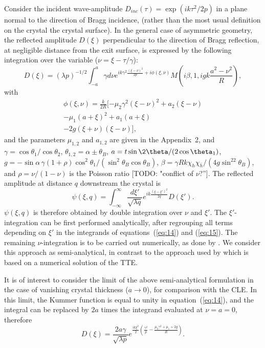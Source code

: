 \documentclass[preprint]{iucr}              %
\newcommand{\todo}[1]{{\color{red}[TODO: "#1'']}}
\newcommand{\inblue}[1]{{\color{blue}#1}}
\begin{document}
Consider the incident  wave-amplitude $D_{inc}(\tau)=\exp(i k \tau^2/ 2 p)$ in a plane normal to the direction of Bragg incidence, \inblue{(rather than the most usual definition on the crystal the crystal surface)}. In the general case of asymmetric geometry, the reflected amplitude $D(\xi)$ perpendicular to the direction of Bragg reflection, at negligible distance from the exit surface, is expressed by the following integration over the variable ($\nu = \xi - \tau / \gamma$):
\begin{equation}
\label{eq:14}
    D(\xi) = (\lambda p)^{-1/2} \int_{-a}^{a}\gamma d\nu e^{i k \gamma^2\frac{(\xi-\nu)^2}{2 p} + 
    i \phi(\xi,\nu)} M(i\beta,1, i g k\frac{a^2-\nu^2}{R}),
\end{equation}
with
\begin{multline}
    \phi(\xi,\nu) =\frac{k}{2R}[-\mu_2\gamma^2(\xi-\nu)^2
    +a_2(\xi-\nu) \\
    -\mu_1(a+\xi)^2 
    +a_1(a+\xi) \\
    -2g(\xi+\nu)(\xi-\nu)],
\end{multline}
and the parameters $\mu_{1,2}$ and $a_{1,2}$ are given in the Appendix~2, and $\gamma=\cos\theta_1/\cos\theta_2$, $\theta_{1,2}=\alpha\pm\theta_B$, $a=t\sin\2\theta/(2\cos\theta_1)$, $g=-\sin\alpha \, \gamma (1+\rho)\cos^2\theta_1/(\sin^2\theta_B\cos\theta_B)$, $\beta=\gamma R k \chi_h\chi_{\bar h}/(4g\sin^22\theta_B)$, and $\rho=\nu/(1-\nu)$ is the Poisson ratio \todo{conflict of $\nu$?}.   
The reflected amplitude at distance $q$ downstream the crystal is
\begin{equation}
\label{eq:15}
    \psi(\xi,q) = \int_{-\infty}^{\infty}\frac{d\xi'}{\sqrt{\lambda q}}e^{i k \frac{(\xi-\xi')^2}{2q}}D(\xi').
\end{equation}
$\psi(\xi,q)$ is therefore obtained by double integration over $\nu$ and $\xi'$. The $\xi'$-integration can be first performed analytically, after regrouping all terms depending on $\xi'$ in the integrands of equations~(\ref{eq:14}) and (\ref{eq:15}). The remaining $\nu$-integration is to be carried out numerically, as done by \cite{GuigayFerrero2016}. We consider this approach as semi-analytical, in contrast to the approach used by \cite{Nesterets} which is based on a numerical solution of the TTE.



It is of interest to consider the limit of the above semi-analytical formulation in the case of vanishing crystal thickness ($a\rightarrow0{}$), for comparison with the CLE. In this limit, the Kummer function is equal to unity in equation~(\ref{eq:14}), and the integral can be replaced by $2a$ times the integrand evaluated at $\nu=a=0$, therefore
\begin{equation}
\label{eq:14reduced}
    D(\xi) = \frac{2 a \gamma}{\sqrt{\lambda p}} e^{\frac{i k \xi^2}{2}(\frac{\gamma^2}{p}-\frac{\mu_2\gamma^2+\mu_1+2g}{R})}.
\end{equation}
\end{document}
